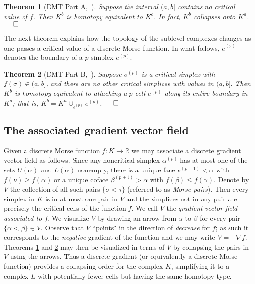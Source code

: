 \documentclass[11pt]{amsart}
\newtheorem{theorem}{Theorem}[section]
\theoremstyle{definition}
\newcommand{\Rspace}{{\mathbb R}}
\begin{document}
\begin{theorem}[DMT Part A,~\cite{forman}] 
\label{theorem:dmt-a}
Suppose the interval $(a,b]$ contains no critical value of $f$. 
Then $K^b$ is homotopy equivalent to $K^a$. 
In fact, $K^b$ collapses onto $K^a$. \hfill $\qed$
\end{theorem}



The next theorem explains how the topology of the sublevel complexes changes as one passes a critical value of a discrete Morse function. In what follows, $\dot{e}^{(p)}$ denotes the boundary of a $p$-simplex $e^{(p)}$. 

\begin{theorem}[DMT Part B,~\cite{forman}] 
\label{theorem:dmt-b}
Suppose $\sigma^{(p)}$ is a critical simplex with $f(\sigma) \in (a,b]$, and there are no other critical simplices with values in $(a,b]$. Then $K^b$ is homotopy equivalent to attaching a $p$-cell $e^{(p)}$ along its entire boundary in $K^a$; that is, $K^b= K^a \cup_{\dot{e}^{(p)}} e^{(p)}$. \hfill $\qed$
\end{theorem}

\subsection*{The associated gradient vector field} Given a discrete Morse function $f:K\to\Rspace$ we may associate a discrete gradient vector field as follows. Since any noncritical simplex $\alpha^{(p)}$ has at most one of the sets $U(\alpha)$ and $L(\alpha)$ nonempty, there is a unique face $\nu^{(p-1)}<\alpha$ with $f(\nu)\ge f(\alpha)$ or a unique coface $\beta^{(p+1)}>\alpha$ with $f(\beta)\le f(\alpha)$. Denote by $V$ the collection of all such pairs $\{\sigma <\tau\}$ (referred to as \emph{Morse pairs}). Then every simplex in $K$ is in at most one pair in $V$ and the simplices not in any pair are precisely the critical cells of the function $f$. We call $V$ the {\em gradient vector field associated to $f$}.  We visualize $V$ by drawing an arrow from $\alpha$ to $\beta$ for every pair $\{\alpha<\beta\}\in V$. Observe that $V$ ``points" in the direction of {\em decrease} for $f$; as such it corresponds to the {\em negative} gradient of the function and we may write $V = -\nabla f$. Theorems \ref{theorem:dmt-a} and \ref{theorem:dmt-b} may then be visualized in terms of $V$ by collapsing the pairs in $V$ using the arrows. Thus a discrete gradient (or equivalently a discrete Morse function) provides a collapsing order for the complex $K$, simplifying it to a complex $L$ with potentially fewer cells but having the same homotopy type.
\end{document}
